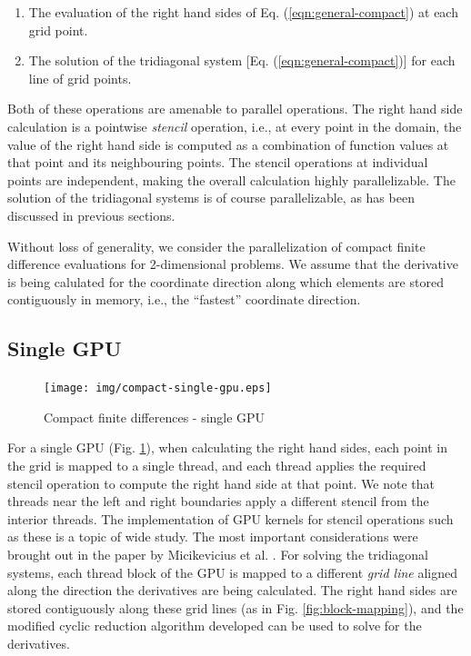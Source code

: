 \begin{enumerate}
\item The evaluation of the right hand sides
    of Eq. (\ref{eqn:general-compact})
    at each grid point.
\item The solution of the tridiagonal system
    [Eq. (\ref{eqn:general-compact})]
    for each line of grid points.
\end{enumerate}

Both of these operations are amenable to parallel operations.
The right hand side calculation is a pointwise
\emph{stencil} operation, i.e.,
at every point in the domain,
the value of the right hand side
is computed as a combination of function values
at that point and its neighbouring points.
The stencil operations at individual points
are independent,
making the overall calculation highly parallelizable.
The solution of the tridiagonal systems
is of course parallelizable,
as has been discussed in previous sections.

Without loss of generality,
we consider the parallelization of
compact finite difference evaluations for 2-dimensional problems.
We assume that the derivative is being calulated
for the coordinate direction along which
elements are stored contiguously in memory, i.e.,
the ``fastest'' coordinate direction.

\subsection{Single GPU}

\begin{figure}
\begin{center}
\texttt{[image: img/compact-single-gpu.eps]}
\caption{Compact finite differences - single GPU}
\label{fig:compact-single-gpu}
\end{center}
\end{figure}

For a single GPU (Fig. \ref{fig:compact-single-gpu}),
when calculating the right hand sides,
each point in the grid is mapped to a single thread,
and each thread applies the required stencil operation
to compute the right hand side at that point.
We note that threads near the left and right boundaries
apply a different stencil from the interior threads.
The implementation of GPU kernels for
stencil operations such as these is a topic of wide study.
The most important considerations were brought out
in the paper by Micikevicius et al. \cite{micikevicius20093d}.
For solving the tridiagonal systems,
each thread block of the GPU is mapped to a
different \emph{grid line}
aligned along the
direction the derivatives are being calculated.
The right hand sides are stored
contiguously along these grid lines
(as in Fig. \ref{fig:block-mapping}),
and the modified cyclic reduction algorithm developed
can be used to solve for the derivatives.

